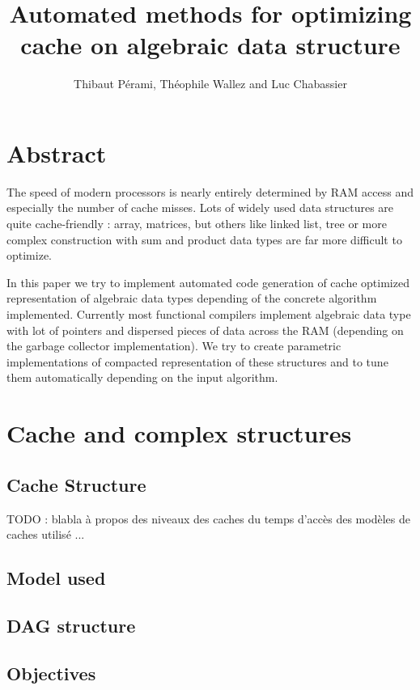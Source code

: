 \documentclass[12pt]{article}
\title{Automated methods for optimizing cache on algebraic data structure}
\author{Thibaut Pérami, Théophile Wallez and Luc Chabassier}
\begin{document}
\maketitle


\section{Abstract}

The speed of modern processors is nearly entirely determined by RAM access and
especially the number of cache misses. Lots of widely used data structures are
quite cache-friendly : array, matrices, but others like linked list, tree or
more complex construction with sum and product data types are far more difficult to
optimize.

In this paper we try to implement automated code generation of cache optimized
representation of algebraic data types depending of the concrete algorithm
implemented. Currently most functional compilers implement algebraic data type with
lot of pointers and dispersed pieces of data across the RAM (depending on the
garbage collector implementation). We try to create parametric implementations
of compacted representation of these structures and to tune them automatically
depending on the input algorithm.

\section{Cache and complex structures}

\subsection{Cache Structure}

TODO : blabla à propos des niveaux des caches du temps d'accès des modèles de
caches utilisé ...

\subsection{Model used}

\subsection{DAG structure}

\subsection{Objectives}
\end{document}
